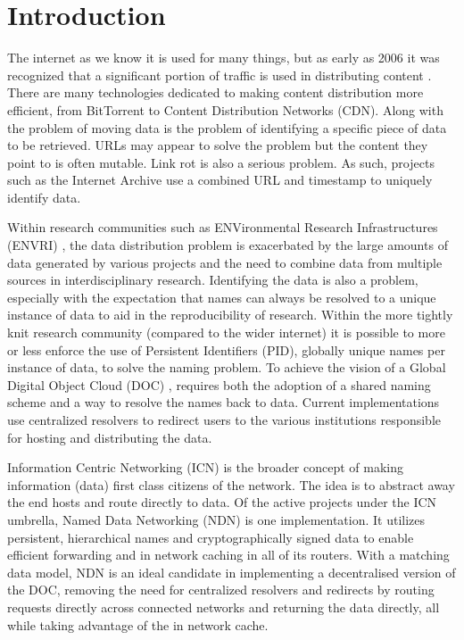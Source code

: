 \documentclass[letterpaper,12pt]{article}
\begin{document}
\section*{Introduction}



The internet as we know it is used for many things, but as early as 2006 it was recognized that a significant portion of traffic is used in distributing content \cite{contentpop}. There are many technologies dedicated to making content distribution more efficient, from BitTorrent to Content Distribution Networks (CDN). Along with the problem of moving data is the problem of identifying a specific piece of data to be retrieved. URLs may appear to solve the problem but the content they point to is often mutable. Link rot is also a serious problem. As such, projects such as the Internet Archive use a combined URL and timestamp to uniquely identify data.

Within research communities such as ENVironmental Research Infrastructures (ENVRI) \cite{envri}, the data distribution problem is exacerbated by the large amounts of data generated by various projects and the need to combine data from multiple sources in interdisciplinary research. Identifying the data is also a problem, especially with the expectation that names can always be resolved to a unique instance of data to aid in the reproducibility of research. Within the more tightly knit research community (compared to the wider internet) it is possible to more or less enforce the use of Persistent Identifiers (PID), globally unique names per instance of data, to solve the naming problem. To achieve the vision of a Global Digital Object Cloud (DOC) \cite{objcloud}, requires both the adoption of a shared naming scheme and a way to resolve the names back to data. Current implementations use centralized resolvers to redirect users to the various institutions responsible for hosting and distributing the data.

Information Centric Networking (ICN) \cite{icn} is the broader concept of making information (data) first class citizens of the network. The idea is to abstract away the end hosts and route directly to data. Of the active projects under the ICN umbrella, Named Data Networking (NDN) \cite{ndn} is one implementation. It utilizes persistent, hierarchical names and cryptographically signed data to enable efficient forwarding and in network caching in all of its routers. With a matching data model, NDN is an ideal candidate in implementing a decentralised version of the DOC, removing the need for centralized resolvers and redirects by routing requests directly across connected networks and returning the data directly, all while taking advantage of the in network cache.
\end{document}
